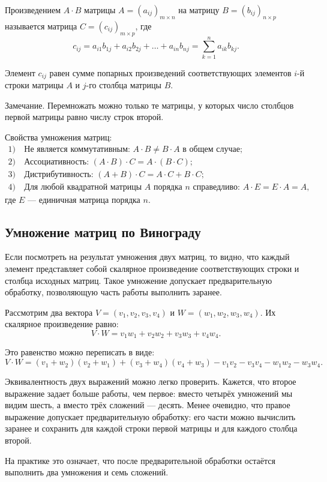 \hspace{1.25cm}
Произведением $A \cdot B$ матрицы $A = (a_{ij})_{m \times n}$ на матрицу $B = (b_{ij})_{n \times p}$ называется матрица $C = (c_{ij})_{m \times p}$, где
\[
c_{ij} = a_{i1}b_{1j} + a_{i2}b_{2j} + \dots + a_{in}b_{nj} = \sum_{k=1}^{n} a_{ik}b_{kj}.
\]

Элемент $c_{ij}$ равен сумме попарных произведений соответствующих элементов $i$-й строки матрицы $A$ и $j$-го столбца матрицы $B$.

Замечание. Перемножать можно только те матрицы, у которых число столбцов первой матрицы равно числу строк второй.

Свойства умножения матриц:
\begin{align*}
1) \ & \text{Не является коммутативным: } A \cdot B \neq B \cdot A \text{ в общем случае}; \\
2) \ & \text{Ассоциативность: } (A \cdot B) \cdot C = A \cdot (B \cdot C); \\
3) \ & \text{Дистрибутивность: } (A + B) \cdot C = A \cdot C + B \cdot C; \\
4) \ & \text{Для любой квадратной матрицы } A \text{ порядка } n \text{ справедливо: } A \cdot E = E \cdot A = A,
\end{align*}
где $E$ — единичная матрица порядка $n$.
\cite{nikitenko}

\subsection{Умножение матриц по Винограду}

\hspace{1.25cm}
Если посмотреть на результат умножения двух матриц, то видно, что каждый элемент представляет собой скалярное произведение соответствующих строки и столбца исходных матриц. Такое умножение допускает предварительную обработку, позволяющую часть работы выполнить заранее.

Рассмотрим два вектора $V = (v_1, v_2, v_3, v_4)$ и $W = (w_1, w_2, w_3, w_4)$. Их скалярное произведение равно:
\[
V \cdot W = v_1 w_1 + v_2 w_2 + v_3 w_3 + v_4 w_4.
\]

Это равенство можно переписать в виде:
\[
V \cdot W = (v_1 + w_2)(v_2 + w_1) + (v_3 + w_4)(v_4 + w_3) - v_1 v_2 - v_3 v_4 - w_1 w_2 - w_3 w_4.
\]

Эквивалентность двух выражений можно легко проверить. Кажется, что второе выражение задает больше работы, чем первое: вместо четырёх умножений мы видим шесть, а вместо трёх сложений — десять. Менее очевидно, что правое выражение допускает предварительную обработку: его части можно вычислить заранее и сохранить для каждой строки первой матрицы и для каждого столбца второй.

На практике это означает, что после предварительной обработки остаётся выполнить два умножения и семь сложений.
\cite{algolib}

\newpage